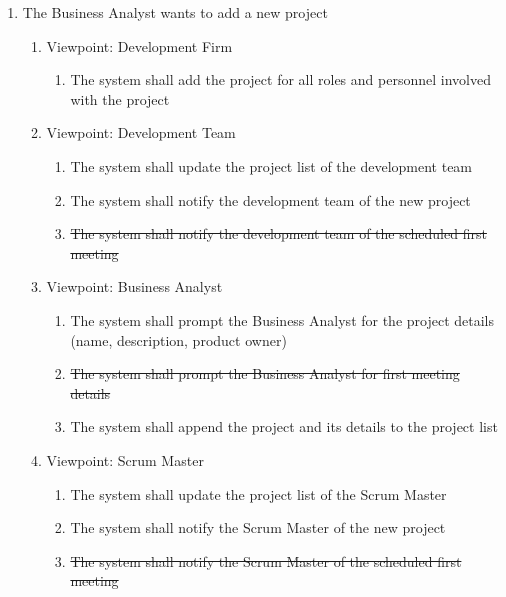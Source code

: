 \documentclass[12pt, titlepage]{article}
\begin{document}
\begin{enumerate}[{BE}1.]
    \item The Business Analyst wants to add a new project
    \begin{enumerate}[{VP}1.] 
        \item Viewpoint: Development Firm
            \begin{enumerate}
                \item The system shall add the project for all roles and personnel involved with the project
            \end{enumerate}
        \item Viewpoint: Development Team
            \begin{enumerate}
                \item The system shall update the project list of the development team
                \item The system shall notify the development team of the new project
                \item \sout{The system shall notify the development team of the scheduled first meeting}
            \end{enumerate}
        \item Viewpoint: Business Analyst
            \begin{enumerate}
                \item The system shall prompt the Business Analyst for the project details (name, description, product owner)
                \item \sout{The system shall prompt the Business Analyst for first meeting details}
                \item The system shall append the project and its details to the project list
            \end{enumerate}
        \item Viewpoint: Scrum Master
            \begin{enumerate}
                \item The system shall update the project list of the Scrum Master
                \item The system shall notify the Scrum Master of the new project
                \item \sout{The system shall notify the Scrum Master of the scheduled first meeting}
            \end{enumerate}
    \end{enumerate}


\end{enumerate}
\end{document}
